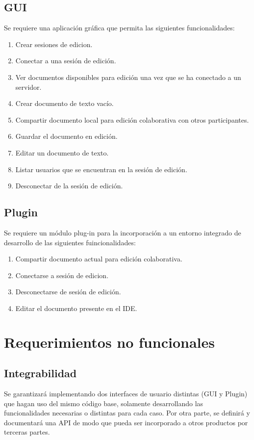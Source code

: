 \documentclass[12pt,a4paper]{article}
\begin{document}
	\subsection{GUI} 
	Se requiere una aplicación gráfica que permita las siguientes funcionalidades:
	\begin{enumerate}
	\item Crear sesiones de edicion.
	\item Conectar a una sesión de edición.
	\item Ver documentos disponibles para edición una vez que se ha conectado a un servidor.
	\item Crear documento de texto vacío.
	\item Compartir documento local para edición colaborativa con otros participantes.
	\item Guardar el documento en edición.
	\item Editar un documento de texto.
	\item Listar usuarios que se encuentran en la sesión de edición.
	\item Desconectar de la sesión de edición.
	\end{enumerate}


\subsection{Plugin}
Se requiere un módulo plug-in para la incorporación a un entorno integrado de desarrollo de las siguientes fuincionalidades:
	\begin{enumerate}
	\item Compartir documento actual para edición colaborativa.
	\item Conectarse a sesión de edicion.
	\item Desconectarse de sesión de edición.
	\item Editar el documento presente en el IDE.
	\end{enumerate}
	\section{Requerimientos no funcionales}


\subsection{Integrabilidad} Se garantizará implementando dos interfaces de usuario distintas (GUI y Plugin) que hagan uso del mismo código base, solamente desarrollando las funcionalidades necesarias o distintas para cada caso.
Por otra parte, se definirá y documentará una API de modo que pueda ser incorporado a otros productos por terceras partes.
\end{document}

